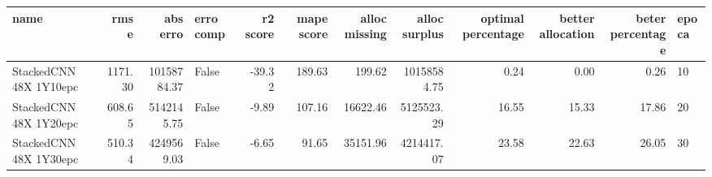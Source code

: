 \begin{tabular}{lrrlrrrrrrrl}
\toprule
name & rmse & abs erro & erro comp & r2 score & mape score & alloc missing & alloc surplus & optimal percentage & better allocation & beter percentage & epoca \\
\midrule
StackedCNN 48X 1Y10epc & 1171.30 & 10158784.37 & False & -39.32 & 189.63 & 199.62 & 10158584.75 & 0.24 & 0.00 & 0.26 & 10 \\
StackedCNN 48X 1Y20epc & 608.65 & 5142145.75 & False & -9.89 & 107.16 & 16622.46 & 5125523.29 & 16.55 & 15.33 & 17.86 & 20 \\
StackedCNN 48X 1Y30epc & 510.34 & 4249569.03 & False & -6.65 & 91.65 & 35151.96 & 4214417.07 & 23.58 & 22.63 & 26.05 & 30 \\
\bottomrule
\end{tabular}
